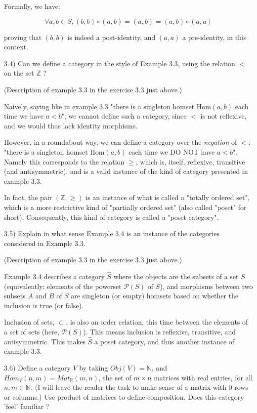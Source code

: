 Formally, we have:

$$\forall a,b \in S, (b,b) \circ (a,b) = (a,b) = (a,b) \circ (a,a)$$

proving that $(b,b)$ is indeed a post-identity, and $(a,a)$ a pre-identity, in this context.



3.4) Can we deﬁne a category in the style of Example 3.3, using the relation $<$ on the set $\mathbb{Z}$ ?

(Description of example 3.3 in the exercise 3.3 just above.)

Naively, saying like in example 3.3 "there is a singleton homset $\text{Hom}(a,b)$ each time we have $a < b$", we cannot define such a category, since $<$ is not reflexive, and we would thus lack identity morphisms.

However, in a roundabout way, we can define a category over the \textit{negation} of $<$: "there is a singleton homset $\text{Hom}(a,b)$ each time we DO NOT have $a < b$". Namely this corresponds to the relation $\ge$, which is, itself, reflexive, transitive (and antisymmetric), and is a valid instance of the kind of category presented in example 3.3.

In fact, the pair $(\mathbb{Z}, \geq)$ is an instance of what is called a "totally ordered set", which is a more restrictive kind of "partially ordered set" (also called "poset" for short). Consequently, this kind of category is called a "poset category".



3.5) Explain in what sense Example 3.4 is an instance of the categories considered in Example 3.3.

(Description of example 3.3 in the exercise 3.3 just above.)

Example 3.4 describes a category $\hat{S}$ where the objects are the subsets of a set $S$ (equivalently: elements of the powerset $\mathcal{P}(S)$ of $S$), and morphisms between two subsets $A$ and $B$ of $S$ are singleton (or empty) homsets based on whether the inclusion is true (or false).

Inclusion of sets, $\subset$, is also an order relation, this time between the elements of a set of sets (here, $\mathcal{P}(S)$). This means inclusion is reflexive, transitive, and antisymmetric. This makes $\hat{S}$ a poset category, and thus another instance of example 3.3. 



3.6) Deﬁne a category $V$ by taking $Obj(V) = \mathbb{N}$, and $Hom_V(n, m) = Mat_\mathbb{R}(m, n)$, the set of $m \times n$ matrices with real entries, for all $n, m \in \mathbb{N}$. (I will leave the reader the task to make sense of a matrix with 0 rows or columns.) Use product of matrices to deﬁne composition. Does this
category 'feel' familiar ?

